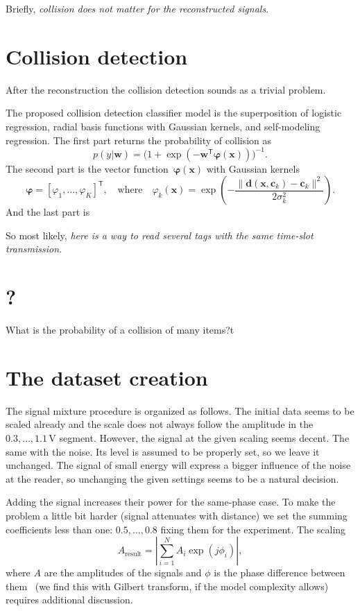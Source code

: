 \documentclass[12pt]{article}
\newcommand{\bw}{\mathbf{w}}
\newcommand{\bwT}{\mathbf{w}^\mathsf{T}}
\newcommand{\T}{^\mathsf{T}}
\newcommand{\bphi}{\boldsymbol{\varphi}}
\newcommand{\bx}{\mathbf{x}}
\newcommand{\bc}{\mathbf{c}}
\newcommand{\bd}{\mathbf{d}}
\begin{document}
Briefly, \emph{collision does not matter for the reconstructed signals}. 

\section{Collision detection}
After the reconstruction the collision detection sounds as a trivial problem.

The proposed collision detection classifier model is the superposition of logistic regression, radial basis functions with Gaussian kernels, and self-modeling regression. The first part returns the probability of collision as
\[
p(y|\bw) =\bigl( 1+\exp(-\bwT\bphi(\bx)) \bigr)^{-1}.
\]
The second part is the vector function~$\bphi(\bx)$ with Gaussian kernels 
\[
\bphi = [\varphi_1,\ldots,\varphi_K]\T, \quad \text{where} \quad \varphi_k(\bx) =  \exp\left(-\frac{\|\bd(\bx, \bc_k) - \bc_k\|^2}{2\sigma_k^2}\right).
\]
And the last part is 




So most likely, \emph{here is a way to read several tags with the same time-slot transmission.}
\section{?}
What is the probability of a collision of many items?t




\section{The dataset creation}
The signal mixture procedure is organized as follows. The initial data seems to be scaled already and the scale does not always follow the amplitude in the $0.3,\ldots,1.1$\,V segment. However, the signal at the given scaling seems decent. The same with the noise. Its level is assumed to be properly set, so we leave it unchanged. The signal of small energy will express a bigger influence of the noise at the reader, so unchanging the given settings seems to be a natural decision. 

Adding the signal increases their power for the same-phase case. To make the problem a little bit harder (signal attenuates with distance) we set the summing coefficients less than one: $0.5,\ldots,0.8$ fixing them for the experiment. The scaling \[A_\text{result} = \left| \sum_{i=1}^{N} A_i \exp({j\phi_i}) \right|,\] where $A$ are the amplitudes of the signals and $\phi$ is the phase difference between them~\cite{Balanis2005} (we find this with Gilbert transform, if the model complexity allows)  requires additional discussion.
\end{document}
